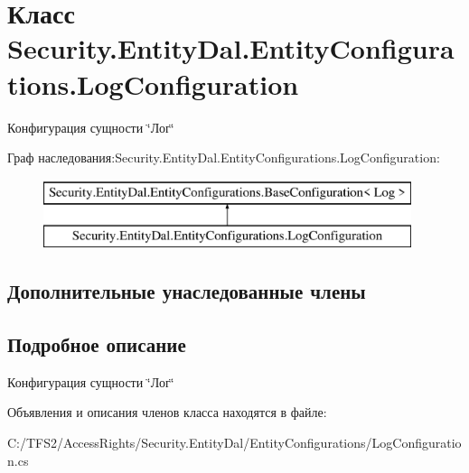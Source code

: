 \hypertarget{class_security_1_1_entity_dal_1_1_entity_configurations_1_1_log_configuration}{}\section{Класс Security.\+Entity\+Dal.\+Entity\+Configurations.\+Log\+Configuration}
\label{class_security_1_1_entity_dal_1_1_entity_configurations_1_1_log_configuration}


Конфигурация сущности \char`\"{}Лог\char`\"{}  


Граф наследования\+:Security.\+Entity\+Dal.\+Entity\+Configurations.\+Log\+Configuration\+:\begin{figure}[H]
\begin{center}
\leavevmode
\includegraphics[height=2.000000cm]{d3/d0c/class_security_1_1_entity_dal_1_1_entity_configurations_1_1_log_configuration}
\end{center}
\end{figure}
\subsection*{Дополнительные унаследованные члены}


\subsection{Подробное описание}
Конфигурация сущности \char`\"{}Лог\char`\"{} 



Объявления и описания членов класса находятся в файле\+:\begin{DoxyCompactItemize}
\item 
C\+:/\+T\+F\+S2/\+Access\+Rights/\+Security.\+Entity\+Dal/\+Entity\+Configurations/Log\+Configuration.\+cs\end{DoxyCompactItemize}
